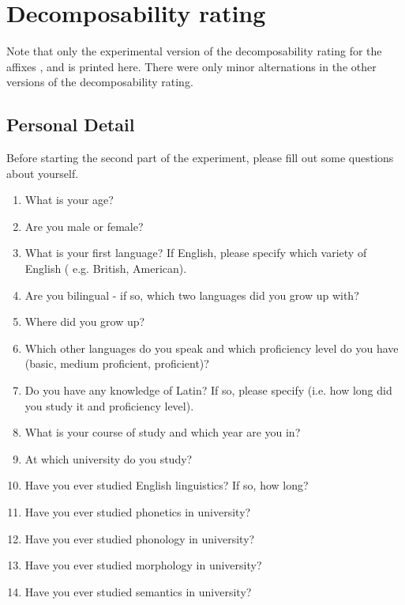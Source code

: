 
\appendix
\addappheadtotoc

\appendixpage

\chapter{Decomposability rating}\label{Appendix A: Decomposability Rating}
Note that only the experimental version of the {decomposability rating} for the affixes ,  and  is printed here. There were only minor alternations in the other versions of the {decomposability rating}.
\section{Personal Detail}
Before starting the second part of the experiment, please fill out some questions about yourself.

\begin{enumerate}
	\item What is your age?
	\item Are you male or female?
	\item What is your first language?  If English, please specify which variety of English ( e.g. British, American).	
	\item Are you bilingual - if so, which two languages did you grow up with?	
	\item Where did you grow up?
	\item Which other languages do you speak and which proficiency level do you have (basic, medium proficient, proficient)?
	\item Do you have any knowledge of Latin? If so, please specify (i.e. how long did you study it and proficiency level).
	\item What is your course of study and which year are you in?
	\item At which university do you study?
	\item Have you ever studied English linguistics? If so, how long?
	\item Have you ever studied phonetics in university?
	\item Have you ever studied phonology in university?
	\item Have you ever studied morphology in university?
	\item Have you ever studied semantics in university?
	
\end{enumerate}
